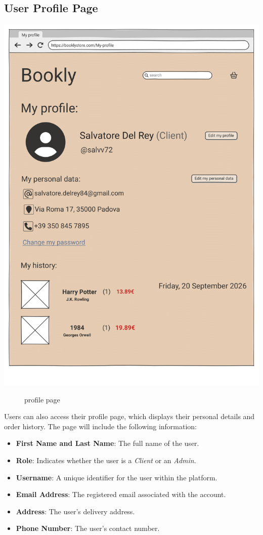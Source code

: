 \subsection{User Profile Page} 

\includegraphics[width=0.6\linewidth]{HW1Report/photos/profilepage2.png}

\begin{figure}[h!]
    \centering
    \caption{profile page}
    \label{fig:enter-label}
\end{figure}

\label{sec:profile}
Users can also access their profile page, which displays their personal details and order history. The page will include the following information:

\begin{itemize}
    \item \textbf{First Name and Last Name}: The full name of the user.
    \item \textbf{Role}: Indicates whether the user is a \textit{Client} or an \textit{Admin}.
    \item \textbf{Username}: A unique identifier for the user within the platform.
    \item \textbf{Email Address}: The registered email associated with the account.
    \item \textbf{Address}: The user's delivery address.
    \item \textbf{Phone Number}: The user's contact number.
\end{itemize}

